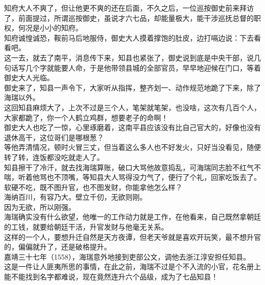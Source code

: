 \begin{multicols}{\theparacolNo}
知府大人不爽了，但让他更不爽的还在后面，不久之后，一位巡按御史前来拜访了，前面提过，所谓巡按御史，虽说才六七品，却能量极大，能干涉巡抚总督的职权，何况是小小的知府。\\

知府诚惶诚恐，鞍前马后地服侍，御史大人摸着撑饱的肚皮，边打嗝边说：下去看看吧。\\

这一去，就去了南平，消息传下来，知县也紧张了，御史说到底是中央干部，说几句话写几个字就能要人命，于是他带领县城的全部官员，早早地迎候在门口，等着御史大人光临。\\

御史来了，知县一声令下，大家听从指挥，整齐划一、动作规范地跪了下来，除了海瑞以外。\\

这回知县麻烦大了，上次不过是三个人，笔架就笔架，也没啥，这次有几百个人，大家都跪了，你一个人鹤立鸡群，想要老子的命啊！\\

御史大人也吃了一惊，心里琢磨着，这南平县应该没有比自己官大的，好像也没有退休高干，这位哥们是哪根葱？\\

等他弄清情况，顿时火冒三丈，但当着这么多人也不好发火，只好当没看见，随便转了转，连饭都没吃就走人了。\\

知县擦干了冷汗，就去找海瑞算账，破口大骂他故意捣乱，可海瑞同志脸不红气不喘，听着他骂也不顶嘴，等知县大人骂得没力气了，便行了个礼，回家吃饭去了。\\

软硬不吃，既不图升官，也不图发财，你能拿他怎么样？\\

海纳百川，有容乃大。壁立千仞，无欲则刚。\\

因为无欲，所以刚强。\\

海瑞确实没有什么欲望，他唯一的工作动力就是工作，在他看来，自己既然拿朝廷的工钱，就要给朝廷干活，升官发财与他毫无关系。\\

这样的一个人，要想升迁自然是天方夜谭，但老天爷就是喜欢开玩笑，最不想升官的，偏偏就升了，还是破格提升。\\

嘉靖三十七年（1558），海瑞意外地接到吏部公文，调他去浙江淳安担任知县。\\

这是一件让人匪夷所思的事情，在此之前，海瑞不过是个不入流的小官，花名册上能不能找到名字都难说，现在竟然连升六个品级，成为了七品知县！\\


\end{multicols}

